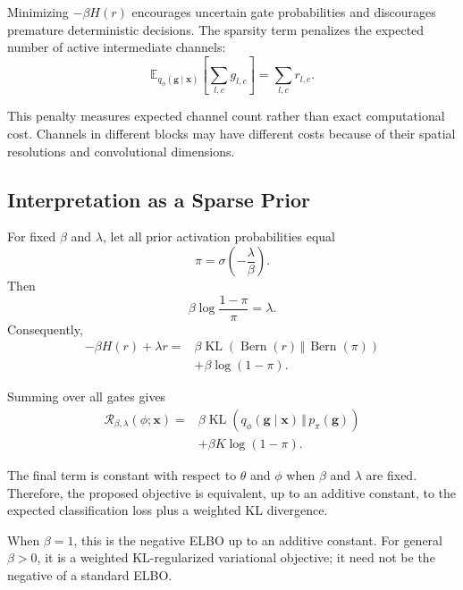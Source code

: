 \documentclass[sigplan,screen]{acmart}
\begin{document}
Minimizing $-\beta H(r)$ encourages uncertain gate
probabilities and discourages premature deterministic
decisions. The sparsity term penalizes the expected number
of active intermediate channels:
\begin{equation}
\mathbb{E}_{q_\phi(\mathbf{g}\mid\mathbf{x})}
\left[
\sum_{l,c}g_{l,c}
\right]
=
\sum_{l,c}r_{l,c}.
\end{equation}

This penalty measures expected channel count rather than
exact computational cost. Channels in different blocks
may have different costs because of their spatial
resolutions and convolutional dimensions.

\subsection{Interpretation as a Sparse Prior}

For fixed $\beta$ and $\lambda$, let all prior activation
probabilities equal
\begin{equation}
\boxed{
\pi=\sigma\left(-\frac{\lambda}{\beta}\right).
}
\end{equation}
Then
\begin{equation}
\beta\log\frac{1-\pi}{\pi}=\lambda.
\end{equation}
Consequently,
\begin{equation}
\begin{split}
-\beta H(r)+\lambda r
={}&
\beta\operatorname{KL}
\left(
\operatorname{Bern}(r)
\,\Vert\,
\operatorname{Bern}(\pi)
\right)
\\
&+\beta\log(1-\pi).
\end{split}
\end{equation}

Summing over all gates gives
\begin{equation}
\begin{split}
\mathcal{R}_{\beta,\lambda}(\phi;\mathbf{x})
={}&
\beta\operatorname{KL}
\left(
q_\phi(\mathbf{g}\mid\mathbf{x})
\,\Vert\,p_\pi(\mathbf{g})
\right)
\\
&+\beta K\log(1-\pi).
\end{split}
\end{equation}

The final term is constant with respect to $\theta$ and
$\phi$ when $\beta$ and $\lambda$ are fixed. Therefore,
the proposed objective is equivalent, up to an additive
constant, to the expected classification loss plus a
weighted KL divergence.

When $\beta=1$, this is the negative ELBO up to an additive
constant. For general $\beta>0$, it is a weighted
KL-regularized variational objective; it need not be the
negative of a standard ELBO.
\end{document}
